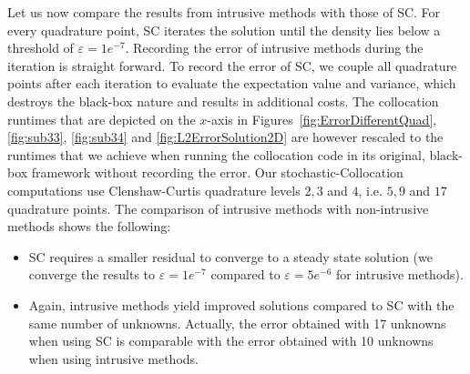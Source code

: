 Let us now compare the results from intrusive methods with those of SC. For every quadrature point, SC iterates the solution until the density lies below a threshold of $\varepsilon = 1e^{-7}$. Recording the error of intrusive methods during the iteration is straight forward. To record the error of SC, we couple all quadrature points after each iteration to evaluate the expectation value and variance, which destroys the black-box nature and results in additional costs. The collocation runtimes that are depicted on the $x$-axis in Figures~\ref{fig:ErrorDifferentQuad}, \ref{fig:sub33}, \ref{fig:sub34} and \ref{fig:L2ErrorSolution2D} are however rescaled to the runtimes that we achieve when running the collocation code in its original, black-box framework without recording the error. Our stochastic-Collocation computations use Clenshaw-Curtis quadrature levels $2,3$ and $4$, i.e. $5,9$ and $17$ quadrature points. The comparison of intrusive methods with non-intrusive methods shows the following:
\begin{itemize}
\item SC requires a smaller residual to converge to a steady state solution (we converge the results to $\varepsilon = 1e^{-7}$ compared to $\varepsilon = 5e^{-6}$ for intrusive methods).
\item Again, intrusive methods yield improved solutions compared to SC with the same number of unknowns. Actually, the error obtained with 17 unknowns when using SC is comparable with the error obtained with 10 unknowns when using intrusive methods.
\end{itemize}

